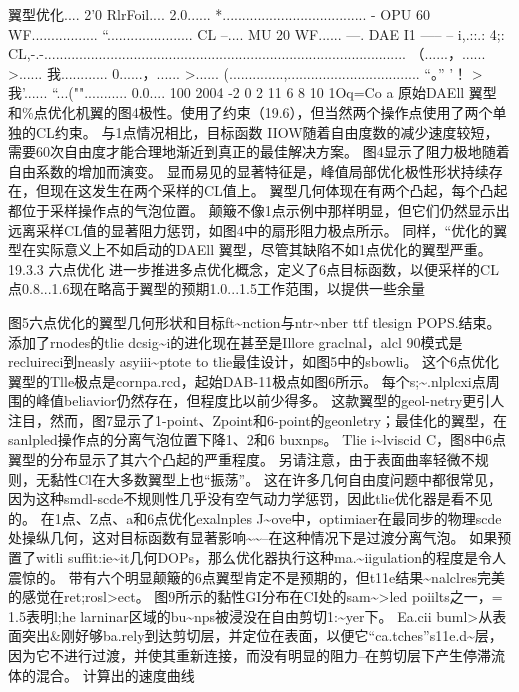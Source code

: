 \documentclass[UTF8,11pt,a4paper,openany,fontset=fandol]{ctexbook}
\begin{document}
翼型优化.... 2'0 RlrFoil.... 2.0...... *..................................... - OPU 60 WF................. “...................... CL --.... MU 20 WF...... ---. DAE I1 ----- -- i,.::.: 4;: CL,-.-............................................................................................. （......，...... >...... 我............ 0......，...... >...... (..............,.................................. “。” '！ >我'...... “...(""........... 0.0.... 100 2004 -2 0 2 11 6 8 10 1Oq=Co a 原始DAEll 翼型和\%点优化机翼的图4极性。使用了约束（19.6），但当然两个操作点使用了两个单独的CL约束。 与1点情况相比，目标函数 IIOW随着自由度数的减少速度较短，需要60次自由度才能合理地渐近到真正的最佳解决方案。 图4显示了阻力极地随着自由系数的增加而演变。 显而易见的显著特征是，峰值局部优化极性形状持续存在，但现在这发生在两个采样的CL值上。 翼型几何体现在有两个凸起，每个凸起都位于采样操作点的气泡位置。 颠簸不像1点示例中那样明显，但它们仍然显示出远离采样CL值的显著阻力惩罚，如图4中的扇形阻力极点所示。 同样，“优化的翼型在实际意义上不如启动的DAEll 翼型，尽管其缺陷不如1点优化的翼型严重。 19.3.3 六点优化 进一步推进多点优化概念，定义了6点目标函数，以便采样的CL点0.8...1.6现在略高于翼型的预期1.0...1.5工作范围，以提供一些余量

图5六点优化的翼型几何形状和目标ft\textasciitilde{}nction与ntr\textasciitilde{}nber ttf tlesign POPS.结束。 添加了rnodes的tlie dcsig\textasciitilde{}i的进化现在甚至是Illore graclnal，alcl 90模式是recluireci到neasly asyiii\textasciitilde{}ptote to tlie最佳设计，如图5中的sbowli。 这个6点优化翼型的Tlle极点是cornpa.rcd，起始DAB-11极点如图6所示。 每个s;\textasciitilde{}.nlplcxi点周围的峰值beliavior仍然存在，但程度比以前少得多。 这款翼型的geol-netry更引人注目，然而，图7显示了1-point、Zpoint和6-point的geonletry；最佳化的翼型，在sanlpled操作点的分离气泡位置下降1、2和6 buxnps。 Tlie i\textasciitilde{}lviscid C，图8中6点翼型的分布显示了其六个凸起的严重程度。 另请注意，由于表面曲率轻微不规则，无黏性Cl在大多数翼型上也“振荡”。 这在许多几何自由度问题中都很常见，因为这种smdl-scde不规则性几乎没有空气动力学惩罚，因此tlie优化器是看不见的。 在1点、Z点、a和6点优化exalnples J\textasciitilde{}ove中，optimiaer在最同步的物理scde处操纵几何，这对目标函数有显著影响\textasciitilde{}\textasciitilde{}--在这种情况下是过渡分离气泡。 如果预置了witli suffit:ie\textasciitilde{}it几何DOPs，那么优化器执行这种ma.\textasciitilde{}iigulation的程度是令人震惊的。 带有六个明显颠簸的6点翼型肯定不是预期的，但t11e结果\textasciitilde{}nalclres完美的感觉在ret;rosl>ect。 图9所示的黏性GI分布在CI处的sam\textasciitilde{}>led poiilts之一，= 1.5表明l;he larninar区域的bu\textasciitilde{}nps被浸没在自由剪切1:\textasciitilde{}yer下。 Ea.cii buml>从表面突出\&刚好够ba.rely到达剪切层，并定位在表面，以便它“ca.tches”s11e.d\textasciitilde{}层，因为它不进行过渡，并使其重新连接，而没有明显的阻力--在剪切层下产生停滞流体的混合。 计算出的速度曲线
\end{document}
